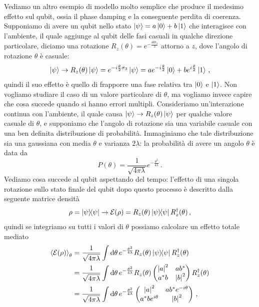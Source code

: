 \noindent Vediamo un altro esempio di modello molto semplice che produce il medesimo effetto sul qubit, ossia il phase damping e la conseguente perdita di coerenza. Supponiamo di avere un qubit nello stato $\ket \psi = a \ket 0 + b \ket 1$ che interagisce con l'ambiente, il quale aggiunge al qubit delle fasi casuali in qualche direzione particolare, diciamo una rotazione $R_z(\theta) = e^{-\frac{i \theta \sigma_3}{2}}$ attorno a $z$, dove l'angolo di rotazione $\theta$ è casuale:
\begin{equation}\label{rotation_on_coeffs}
    \ket{\psi} \rightarrow R_z(\theta)\ket \psi = e^{-i\frac \theta 2 \sigma_3}\ket \psi = a e^{-i\frac \theta 2} \ket 0 + b e^{i\frac \theta 2} \ket 1 \, ,
\end{equation}
quindi il suo effetto è quello di frapporre una fase relativa tra $\ket{0}$ e $\ket{1}$. Non vogliamo studiare il caso di un valore particolare di $\theta$, ma vogliamo invece capire che cosa succede quando si hanno errori multipli. Consideriamo un'interazione continua con l'ambiente, il quale causa $\ket{\psi} \to R_z(\theta) \ket{\psi}$ per qualche valore casuale di $\theta$, e supponiamo che l'angolo di rotazione sia una variabile casuale con una ben definita distribuzione di probabilità. Immaginiamo che tale distribuzione sia una gaussiana con media $\theta$ e varianza $2\lambda$: la probabilità di avere un angolo $\theta$ è data da
\begin{equation*}
    P(\theta) = \frac{1}{\sqrt{4 \pi \lambda}} e^{-\frac{\theta^2}{4\lambda}} \, .
\end{equation*}
Vediamo cosa succede al qubit aspettando del tempo: l'effetto di una singola rotazione sullo stato finale del qubit dopo questo processo è descritto dalla seguente matrice densità
\begin{equation*}
    \rho = \op{\psi}{\psi} \rightarrow \mathcal{E}(\rho) =  R_z(\theta)\op{\psi}{\psi}R_z^\dagger(\theta) \, ,
\end{equation*}
quindi se integriamo su tutti i valori di $\theta$ possiamo calcolare un effetto totale mediato
\begin{align*}
    \expval{\mathcal{E}(\rho)}_\theta &= \frac{1}{\sqrt{4\pi\lambda}} \int \dd{\theta} e^{-\frac{\theta^2}{4\lambda}}R_z(\theta)\op{\psi}{\psi}R_z^\dagger(\theta) \\
    &= \frac{1}{\sqrt{4\pi\lambda}} \int \dd{\theta} e^{-\frac{\theta^2}{4\lambda}}R_z(\theta)
    \begin{pmatrix}
        \abs{a}^2 & ab^* \\
        a^*b & \abs{b}^2
    \end{pmatrix}
    R_z^\dagger(\theta) \\
    &= \frac{1}{\sqrt{4\pi\lambda}} \int \dd{\theta} e^{-\frac{\theta^2}{4\lambda}}
    \begin{pmatrix}
        \abs{a}^2 & ab^*e^{-i\theta} \\
        a^*be^{i\theta} & \abs{b}^2
    \end{pmatrix} \, ,
\end{align*}
